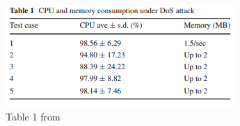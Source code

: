\begin{figure}[H] \label{addie table}
    \centering
    \includegraphics{Apdenix/adiTable.PNG}
    \caption{Table 1 from \cite{adi2017stealthy}}
    \label{fig:my_label}
\end{figure}